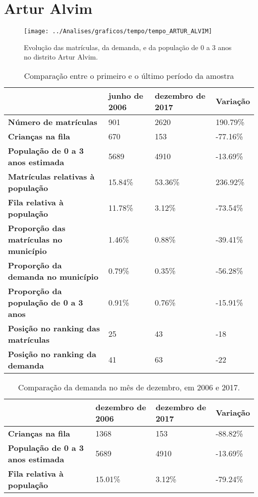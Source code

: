 \section{Artur Alvim}
\begin{figure}[H]
\centering
\texttt{[image: ../Analises/graficos/tempo/tempo\_ARTUR\_ALVIM]}
\caption{Evolução das matrículas, da demanda, e da população de 0 a 3 anos no distrito Artur Alvim.}
\end{figure}
\begin{table}[H]
\begin{tabular}{|l|l|l|l|}
\hline
\textbf{}                                      & \textbf{junho de 2006}       & \textbf{dezembro de 2017}    & \textbf{Variação} \\ \hline
\textbf{Número de matrículas}                  & 901 & 2620 & 190.79\% \\ \hline
\textbf{Crianças na fila}                      & 670 & 153 & -77.16\% \\ \hline
\textbf{População de 0 a 3 anos estimada}      & 5689 & 4910 & -13.69\% \\ \hline
\textbf{Matrículas relativas à população}      & 15.84\% & 53.36\% & 236.92\% \\ \hline
\textbf{Fila relativa à população}             & 11.78\% & 3.12\% & -73.54\% \\ \hline
\textbf{Proporção das matrículas no município} & 1.46\% & 0.88\% & -39.41\% \\ \hline
\textbf{Proporção da demanda no município}     & 0.79\% & 0.35\% & -56.28\% \\ \hline
\textbf{Proporção da população de 0 a 3 anos}  & 0.91\% & 0.76\% & -15.91\% \\ \hline
\textbf{Posição no ranking das matrículas}     & 25 & 43 & -18 \\ \hline
\textbf{Posição no ranking da demanda}         & 41 & 63 & -22 \\ \hline
\end{tabular}
\caption{Comparação entre o primeiro e o último período da amostra}
\end{table}
\begin{table}[H]
\begin{tabular}{|l|l|l|l|}
\hline
\textbf{}                                 & \textbf{dezembro de 2006} & \textbf{dezembro de 2017} & \textbf{Variação} \\ \hline
\textbf{Crianças na fila}                      & 1368 & 153 & -88.82\% \\ \hline
\textbf{População de 0 a 3 anos estimada}      & 5689 & 4910 & -13.69\% \\ \hline
\textbf{Fila relativa à população}             & 15.01\% & 3.12\% & -79.24\% \\ \hline
\end{tabular}
\caption{Comparação da demanda no mês de dezembro, em 2006 e 2017.}
\end{table}
